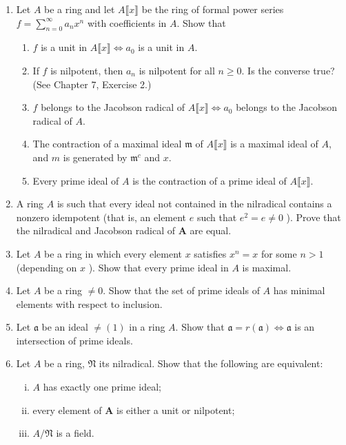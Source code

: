 \documentclass[class=book, crop=false]{standalone}
\theoremstyle{definition}
\theoremstyle{remark}
\begin{document}
\begin{enumerate}[series=exc1]
  \item Let $A$ be a ring and let $A\lBrack x\rBrack $ be the ring of formal power series
  $f=\sum_{n=0}^{\infty} a_{n} x^{n}$ with coefficients in $A$. Show that
  \begin{enumerate}
    \item $f$ is a unit in $A\lBrack x\rBrack  \iff a_{0}$ is a unit in $A$.
    \item If $f$ is nilpotent, then $a_{n}$ is nilpotent for all $n \geq 0$. Is the
converse true? (See Chapter 7, Exercise 2.)
    \item $f$ belongs to the Jacobson radical of $A\lBrack x\rBrack  \iff a_{0}$
belongs to the Jacobson radical of $A$.
    \item The contraction of a maximal ideal $\mathfrak{m}$ of $A\lBrack x\rBrack $ is a maximal
ideal of $A$, and $m$ is generated by $\mathfrak{m}^{c}$ and $x$.
    \item Every prime ideal of $A$ is the contraction of a prime ideal of $A\lBrack x\rBrack $.
  \end{enumerate}

  \item A ring $A$ is such that every ideal not contained in the nilradical
        contains a nonzero idempotent (that is, an element $e$ such that
        $e^{2}=e \neq 0$ ). Prove that the nilradical and Jacobson radical of
        $\boldsymbol{A}$ are equal.

  \item Let $A$ be a ring in which every element $x$ satisfies $x^{n}=x$ for
        some $n>1$ (depending on $x$ ). Show that every prime ideal in $A$ is
        maximal.

  \item Let $A$ be a ring $\neq 0$. Show that the set of prime ideals of $A$ has
        minimal elements with respect to inclusion.

  \item Let $\mathfrak{a}$ be an ideal $\neq (1)$ in a ring $A$. Show that
        $\mathfrak{a}=r(\mathfrak{a}) \iff \mathfrak{a}$ is an
        intersection of prime ideals.

  \item Let $A$ be a ring, $\mathfrak{N}$ its nilradical. Show that the following are
        equivalent:
\begin{enumerate}[i)]
  \item $A$ has exactly one prime ideal;
  \item every element of $\boldsymbol{A}$ is either a unit or nilpotent;
  \item $A / \mathfrak{N}$ is a field.
\end{enumerate}


\end{enumerate}
\end{document}

